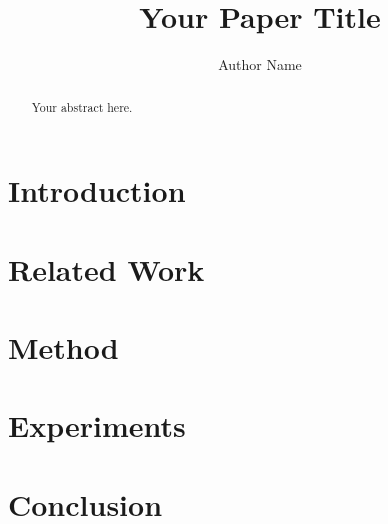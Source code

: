 \documentclass[sigconf]{acmart}
\title{Your Paper Title}
\author{Author Name}
\affiliation{
  \institution{Institution}
  \city{City}
  \country{Country}
}
\begin{document}
\begin{abstract}
Your abstract here.
\end{abstract}

\maketitle

\section{Introduction}

\section{Related Work}

\section{Method}

\section{Experiments}

\section{Conclusion}



\end{document}
